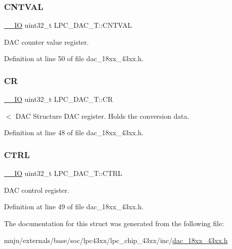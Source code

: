 \subsubsection{\texorpdfstring{C\+N\+T\+V\+AL}{CNTVAL}}
{\footnotesize\ttfamily \hyperlink{core__sc300_8h_aec43007d9998a0a0e01faede4133d6be}{\+\_\+\+\_\+\+IO} uint32\+\_\+t L\+P\+C\+\_\+\+D\+A\+C\+\_\+\+T\+::\+C\+N\+T\+V\+AL}

D\+AC counter value register. 

Definition at line 50 of file dac\+\_\+18xx\+\_\+43xx.\+h.

\mbox{\label{struct_l_p_c___d_a_c___t_a9e9bbab757da4f3ef793da168224eb9d}} 
\subsubsection{\texorpdfstring{CR}{CR}}
{\footnotesize\ttfamily \hyperlink{core__sc300_8h_aec43007d9998a0a0e01faede4133d6be}{\+\_\+\+\_\+\+IO} uint32\+\_\+t L\+P\+C\+\_\+\+D\+A\+C\+\_\+\+T\+::\+CR}

$<$ D\+AC Structure D\+AC register. Holds the conversion data. 

Definition at line 48 of file dac\+\_\+18xx\+\_\+43xx.\+h.

\mbox{\label{struct_l_p_c___d_a_c___t_a602c1a7a50c8372683c0eef978e2c149}} 
\subsubsection{\texorpdfstring{C\+T\+RL}{CTRL}}
{\footnotesize\ttfamily \hyperlink{core__sc300_8h_aec43007d9998a0a0e01faede4133d6be}{\+\_\+\+\_\+\+IO} uint32\+\_\+t L\+P\+C\+\_\+\+D\+A\+C\+\_\+\+T\+::\+C\+T\+RL}

D\+AC control register. 

Definition at line 49 of file dac\+\_\+18xx\+\_\+43xx.\+h.



The documentation for this struct was generated from the following file\+:\begin{DoxyCompactItemize}
\item 
muju/externals/base/soc/lpc43xx/lpc\+\_\+chip\+\_\+43xx/inc/\hyperlink{dac__18xx__43xx_8h}{dac\+\_\+18xx\+\_\+43xx.\+h}\end{DoxyCompactItemize}
